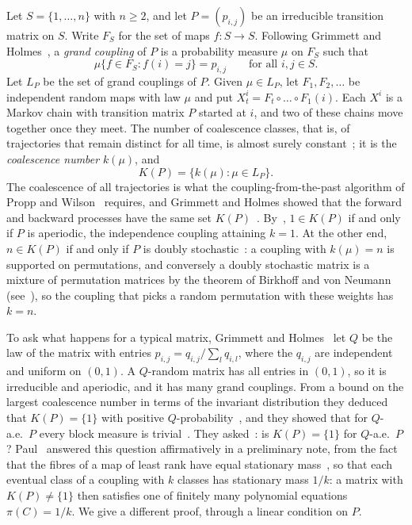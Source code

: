 \documentclass[11pt]{amsart}
\theoremstyle{remark}
\begin{document}
Let $S=\{1,\dots,n\}$ with $n\ge2$, and let $P=(p_{i,j})$ be an irreducible transition matrix on $S$. Write $F_S$ for
the set of maps $f:S\to S$. Following Grimmett and Holmes~\cite{GH21,GH26}, a \emph{grand coupling} of $P$ is a
probability measure $\mu$ on $F_S$ such that
\begin{equation}\label{eq:consistent}
\mu\{f\in F_S: f(i)=j\}=p_{i,j}\qquad\text{for all }i,j\in S.
\end{equation}
Let $L_P$ be the set of grand couplings of $P$. Given $\mu\in L_P$, let $F_1,F_2,\dots$ be independent random maps with
law $\mu$ and put $X^i_t=F_t\circ\dots\circ F_1(i)$. Each $X^i$ is a Markov chain with transition matrix $P$ started at
$i$, and two of these chains move together once they meet. The number of coalescence classes, that is, of
trajectories that remain distinct for all time, is almost surely constant~\cite[Lemma~2]{GH21}; it is the
\emph{coalescence number} $k(\mu)$, and
\[
K(P)=\{k(\mu):\mu\in L_P\}.
\]
The coalescence of all trajectories is what the coupling-from-the-past algorithm of Propp and Wilson~\cite{PW96}
requires, and Grimmett and Holmes showed that the forward and backward processes have the same set
$K(P)$~\cite{GH21}. By~\cite[Theorem~3.13]{GH26}, $1\in K(P)$ if and only if $P$ is aperiodic, the independence coupling
attaining $k=1$. At the other end, $n\in K(P)$ if and only if $P$ is doubly stochastic~\cite[Theorem~4]{GH21}: a
coupling with $k(\mu)=n$ is supported on permutations, and conversely a doubly stochastic matrix is a mixture of
permutation matrices by the theorem of Birkhoff and von Neumann~\cite{Bir46} (see~\cite[Theorem~2.6]{GH26}), so the
coupling that picks a random permutation with these weights has $k=n$.

To ask what happens for a typical matrix, Grimmett and Holmes~\cite[Remark~2.4]{GH26} let $Q$ be the law of the matrix
with entries $p_{i,j}=q_{i,j}/\sum_{l}q_{i,l}$, where the $q_{i,j}$ are independent and uniform on $(0,1)$. A $Q$-random
matrix has all entries in $(0,1)$, so it is irreducible and aperiodic, and it has many grand couplings. From a bound
on the largest coalescence number in terms of the invariant distribution they deduced that $K(P)=\{1\}$ with positive
$Q$-probability~\cite[Theorem~3.5, Remark~3.7]{GH26}, and they showed that for $Q$-a.e.\ $P$ every block measure is
trivial~\cite[Lemma~5.1]{GH26}. They asked~\cite[Open problem~3.8]{GH26}: is $K(P)=\{1\}$ for $Q$-a.e.\ $P$? Paul~\cite{Pau26} answered this
question affirmatively in a preliminary note, from the fact that the fibres of a map of least rank have equal
stationary mass~\cite[Theorem~4.1]{Yan13}, so that each eventual class of a coupling with $k$ classes has stationary
mass $1/k$: a matrix with $K(P)\neq\{1\}$ then satisfies one of finitely many polynomial
equations $\pi(C)=1/k$. We give a different proof, through a linear condition on $P$.
\end{document}
